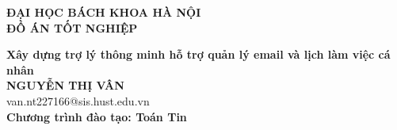 \documentclass[DoAn.tex]{subfiles}
\begin{document}
\begin{titlepage}
\thispagestyle{empty}
\begin{center}

{\textbf{\large{ĐẠI HỌC BÁCH KHOA HÀ NỘI}}}\\[4cm]

{\textbf{\huge{ ĐỒ ÁN TỐT NGHIỆP}}}\\[1cm]
{\textbf{\Large{Xây dựng trợ lý thông minh hỗ trợ quản lý email và lịch làm việc cá nhân}}\\[1cm]

{\textbf{\large{NGUYỄN THỊ VÂN}}}\\
{\large{van.nt227166@sis.hust.edu.vn}}\\[0.5cm]

{\textbf{\large{Chương trình đào tạo: Toán Tin
}}}\\

\vspace{4cm}
\begin{table}[H]
\centering
{}
\end{table}}
\end{center}



\end{titlepage}
\end{document}
